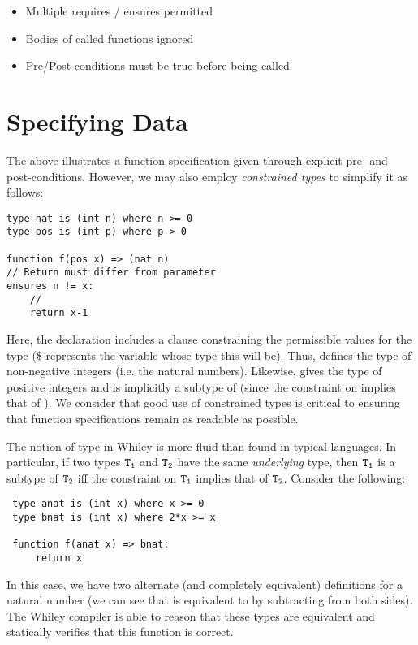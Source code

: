 \begin{itemize}

\item Multiple requires / ensures permitted
\item Bodies of called functions ignored
\item Pre/Post-conditions must be true before being called
\end{itemize}

\section{Specifying Data}

The above illustrates a function specification given through explicit pre- and
post-conditions.  However, we may also employ {\em constrained types}
to simplify it as follows:

\begin{lstlisting}
type nat is (int n) where n >= 0
type pos is (int p) where p > 0

function f(pos x) => (nat n)
// Return must differ from parameter
ensures n != x:
    //
    return x-1
\end{lstlisting}

Here, the  declaration includes a 
clause constraining the permissible values for the type ($\$$
represents the variable whose type this will be).  Thus,
 defines the type of non-negative integers (i.e. the
natural numbers).  Likewise,  gives the type of
positive integers and is implicitly a subtype of 
(since the constraint on  implies that of
).  We consider that good use of constrained types is
critical to ensuring that function specifications remain as readable
as possible.

The notion of type in Whiley is more fluid than found in typical
languages.  In particular, if two types ${\tt T_1}$ and ${\tt T_2}$
have the same {\em underlying} type, then ${\tt T_1}$ is a subtype of
${\tt T_2}$ iff the constraint on ${\tt T_1}$ implies that of ${\tt
  T_2}$.  Consider the following:

\begin{lstlisting}
 type anat is (int x) where x >= 0
 type bnat is (int x) where 2*x >= x

 function f(anat x) => bnat:
     return x
\end{lstlisting}
In this case, we have two alternate (and completely equivalent)
definitions for a natural number (we can see that  is
equivalent to  by subtracting  from both sides).
The Whiley compiler is able to reason that these types are equivalent
and statically verifies that this function is correct.

